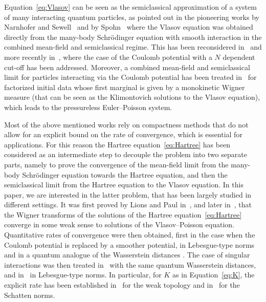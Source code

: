 \documentclass[10pt]{amsart}
\theoremstyle{definition}
\renewcommand {\(} {\lt(}
\renewcommand {\)} {\rt)}
\begin{document}
Equation~\eqref{eq:Vlasov} can be seen as the semiclassical approximation of a system of many interacting quantum particles, as pointed out in the pioneering works by Narnhofer and Sewell~\cite{narnhofer_vlasov_1981} and by Spohn~\cite{spohn_vlasov_1981} where the Vlasov equation was obtained directly from the many-body Schrödinger equation with smooth interaction in the combined mean-field and semiclassical regime. This has been reconsidered in~\cite{graffi_mean-field_2003} and more recently in~\cite{chong_many-body_2021, chen_combined_2021}, where the case of the Coulomb potential with a $N$ dependent cut-off has been addressed. Moreover, a combined mean-field and semiclassical limit for particles interacting via the Coulomb potential has been treated in~\cite{golse_mean-field_2021} for factorized initial data whose first marginal is given by a monokinetic Wigner measure (that can be seen as the Klimontovich solutions to the Vlasov equation), which leads to the pressureless Euler--Poisson system.

Most of the above mentioned works rely on compactness methods that do not allow for an explicit bound on the rate of convergence, which is essential for applications. For this reason the Hartree equation~\eqref{eq:Hartree} has been considered as an intermediate step to decouple the problem into two separate parts, namely to prove the convergence of the mean-field limit from the many-body Schrödinger equation towards the Hartree equation, and then the semiclassical limit from the Hartree equation to the Vlasov equation. In this paper, we are interested in the latter problem, that has been largely studied in different settings. It was first proved by Lions and Paul in~\cite{lions_sur_1993}, and later in~\cite{markowich_classical_1993,figalli_semiclassical_2012}, that the Wigner transforms of the solutions of the Hartree equation~\eqref{eq:Hartree} converge in some weak sense to solutions of the Vlasov--Poisson equation. Quantitative rates of convergence were then obtained, first in the case when the Coulomb potential is replaced by a smoother potential, in Lebesgue-type norms~\cite{athanassoulis_strong_2011, amour_semiclassical_2013, benedikter_hartree_2016} and in a quantum analogue of the Wasserstein distances \cite{golse_schrodinger_2017}. The case of singular interactions was then treated in~\cite{lafleche_propagation_2019, lafleche_global_2021} with the same quantum Wasserstein distances, and in~\cite{saffirio_semiclassical_2019, saffirio_hartree_2020, lafleche_strong_2021} in Lebesgue-type norms. In particular, for $K$ as in Equation~\eqref{eq:K}, the explicit rate has been established in~\cite{lafleche_propagation_2019} for the weak topology and in~\cite{saffirio_hartree_2020, lafleche_strong_2021} for the Schatten norms.
\end{document}
